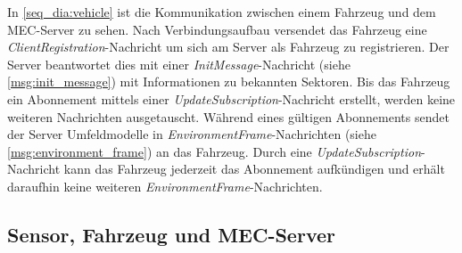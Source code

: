 In \autoref{seq_dia:vehicle} ist die Kommunikation zwischen einem Fahrzeug und dem MEC-Server zu sehen.
Nach Verbindungsaufbau versendet das Fahrzeug eine \textit{ClientRegistration}-Nachricht um sich am Server als Fahrzeug zu registrieren.
Der Server beantwortet dies mit einer \textit{InitMessage}-Nachricht (siehe \autoref{msg:init_message}) mit Informationen zu bekannten Sektoren.
Bis das Fahrzeug ein Abonnement mittels einer \textit{UpdateSubscription}-Nachricht erstellt, werden keine weiteren Nachrichten ausgetauscht.
Während eines gültigen Abonnements sendet der Server Umfeldmodelle in \textit{EnvironmentFrame}-Nachrichten (siehe \autoref{msg:environment_frame}) an das Fahrzeug.
Durch eine \textit{UpdateSubscription}-Nachricht kann das Fahrzeug jederzeit das Abonnement aufkündigen und erhält daraufhin keine weiteren \textit{EnvironmentFrame}-Nachrichten.

\subsection{Sensor, Fahrzeug und MEC-Server}

